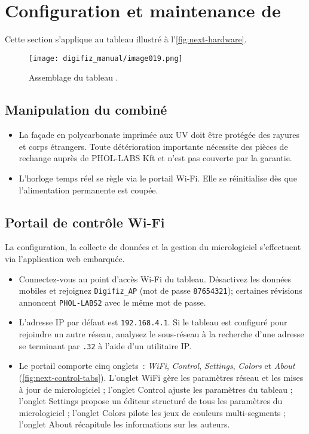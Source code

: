 \chapter{Configuration et maintenance de \ReplicaNextLong{}}\label{ch:replica-next-setup}

Cette section s'applique au tableau \ReplicaNextLong{} illustré à l'\autoref{fig:next-hardware}.

\begin{figure}[htbp]
    \centering
    \texttt{[image: digifiz\_manual/image019.png]}
    \caption{Assemblage du tableau \ReplicaNextLong{}.}
    \label{fig:next-hardware}
\end{figure}

\section{Manipulation du combiné}
\begin{itemize}
    \item La façade en polycarbonate imprimée aux UV doit être protégée des rayures et corps étrangers. Toute détérioration importante nécessite des pièces de rechange auprès de PHOL-LABS Kft et n'est pas couverte par la garantie.
    \item L'horloge temps réel se règle via le portail Wi-Fi. Elle se réinitialise dès que l'alimentation permanente est coupée.
\end{itemize}

\section{Portail de contrôle Wi-Fi}
La configuration, la collecte de données et la gestion du micrologiciel s'effectuent via l'application web embarquée.
\begin{itemize}
    \item Connectez-vous au point d'accès Wi-Fi du tableau. Désactivez les données mobiles et rejoignez \texttt{Digifiz\_AP} (mot de passe \texttt{87654321}); certaines révisions annoncent \texttt{PHOL-LABS2} avec le même mot de passe.
    \item L'adresse IP par défaut est \texttt{192.168.4.1}. Si le tableau est configuré pour rejoindre un autre réseau, analysez le sous-réseau à la recherche d'une adresse se terminant par \texttt{.32} à l'aide d'un utilitaire IP.
    \item Le portail comporte cinq onglets~: \emph{WiFi}, \emph{Control}, \emph{Settings}, \emph{Colors} et \emph{About} (\autoref{fig:next-control-tabs}). L'onglet WiFi gère les paramètres réseau et les mises à jour de micrologiciel ; l'onglet Control ajuste les paramètres du tableau ; l'onglet Settings propose un éditeur structuré de tous les paramètres du micrologiciel ; l'onglet Colors pilote les jeux de couleurs multi-segments ; l'onglet About récapitule les informations sur les auteurs.
\end{itemize}


